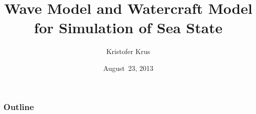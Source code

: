 \begin{frame}
\title{Wave Model and Watercraft Model for Simulation of Sea State} %
\author{Kristofer Krus} %
\date{\mbox{August 23}, 2013} %
\titlepage
\end{frame}

\begin{frame}
\frametitle{Outline}
\tableofcontents
\end{frame}
